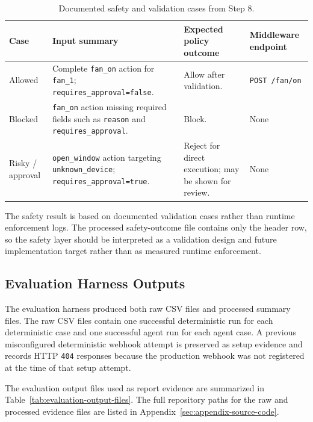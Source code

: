 \begin{table}[H]
  \centering
  \small
  \caption{Documented safety and validation cases from Step 8.}
  \label{tab:safety-validation-cases}
  \renewcommand{\arraystretch}{1.18}
  \begin{tabularx}{\textwidth}{@{}L{0.15\textwidth}Y L{0.25\textwidth}L{0.17\textwidth}@{}}
    \toprule
    Case & Input summary & Expected policy outcome & Middleware endpoint \\
    \midrule
    Allowed &
    Complete \texttt{fan\_on} action for \texttt{fan\_1}; \texttt{requires\_approval=false}. &
    Allow after validation. &
    \texttt{POST /fan/on} \\
    Blocked &
    \texttt{fan\_on} action missing required fields such as \texttt{reason} and \texttt{requires\_approval}. &
    Block. &
    None \\
    Risky / approval &
    \texttt{open\_window} action targeting \texttt{unknown\_device}; \texttt{requires\_approval=true}. &
    Reject for direct execution; may be shown for review. &
    None \\
    \bottomrule
  \end{tabularx}
\end{table}

The safety result is based on documented validation cases rather than runtime enforcement logs. The processed safety-outcome file contains only the header row, so the safety layer should be interpreted as a validation design and future implementation target rather than as measured runtime enforcement.

\subsection{Evaluation Harness Outputs}\label{subsec:results-harness-outputs}

The evaluation harness produced both raw CSV files and processed summary files. The raw CSV files contain one successful deterministic run for each deterministic case and one successful agent run for each agent case. A previous misconfigured deterministic webhook attempt is preserved as setup evidence and records HTTP \texttt{404} responses because the production webhook was not registered at the time of that setup attempt.

The evaluation output files used as report evidence are summarized in Table~\ref{tab:evaluation-output-files}. The full repository paths for the raw and processed evidence files are listed in Appendix~\ref{sec:appendix-source-code}.


